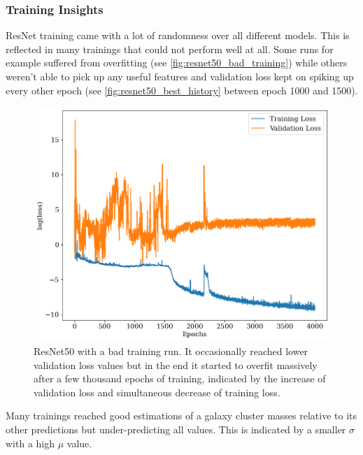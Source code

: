 \subsubsection*{Training Insights}
ResNet training came with a lot of randomness over all different models. This is reflected in many trainings that could not perform well at all.
Some runs for example suffered from overfitting (see \autoref{fig:resnet50_bad_training}) while others weren't able to pick up any useful features and validation loss kept on spiking up every other epoch (see \autoref{fig:resnet50_best_history} between epoch 1000 and 1500).

\begin{figure}[H]
\centering
\includegraphics[width=.667\textwidth]{images/Chapter4/ResNet50/res50_bad_history.png}
\caption{ResNet50 with a bad training run. It occasionally reached lower validation loss values but in the end it started to overfit massively after a few thousand epochs of training, indicated by the increase of validation loss and simultaneous decrease of training loss.} 
\label{fig:resnet50_bad_training}
\end{figure}

Many trainings reached good estimations of a galaxy cluster masses relative to its other predictions but under-predicting all values. This is indicated by a smaller $\sigma$ with a high $\mu$ value.

